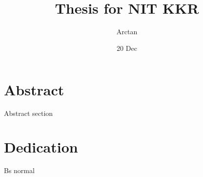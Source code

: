 \documentclass{report}
\title{Thesis for \Large{NIT KKR}}
\author{Arctan}
\date{20 Dec}
\begin{document}
\maketitle    

\chapter*{Abstract}
Abstract section

\chapter*{Dedication}
Bs normal 
\end{document}
